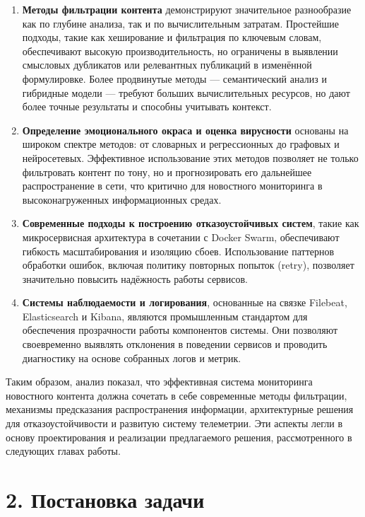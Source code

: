 \begin{enumerate}
\def\labelenumi{\arabic{enumi}.}
\tightlist
\item
  \textbf{Методы фильтрации контента} демонстрируют значительное
  разнообразие как по глубине анализа, так и по вычислительным затратам.
  Простейшие подходы, такие как хеширование и фильтрация по ключевым
  словам, обеспечивают высокую производительность, но ограничены в
  выявлении смысловых дубликатов или релевантных публикаций в изменённой
  формулировке. Более продвинутые методы --- семантический анализ и
  гибридные модели --- требуют больших вычислительных ресурсов, но дают
  более точные результаты и способны учитывать контекст.\\
\item
  \textbf{Определение эмоционального окраса и оценка вирусности}
  основаны на широком спектре методов: от словарных и регрессионных до
  графовых и нейросетевых. Эффективное использование этих методов
  позволяет не только фильтровать контент по тону, но и прогнозировать
  его дальнейшее распространение в сети, что критично для новостного
  мониторинга в высоконагруженных информационных средах.\\
\item
  \textbf{Современные подходы к построению отказоустойчивых систем},
  такие как микросервисная архитектура в сочетании с Docker Swarm,
  обеспечивают гибкость масштабирования и изоляцию сбоев. Использование
  паттернов обработки ошибок, включая политику повторных попыток
  (retry), позволяет значительно повысить надёжность работы сервисов.\\
\item
  \textbf{Системы наблюдаемости и логирования}, основанные на связке
  Filebeat, Elasticsearch и Kibana, являются промышленным стандартом для
  обеспечения прозрачности работы компонентов системы. Они позволяют
  своевременно выявлять отклонения в поведении сервисов и проводить
  диагностику на основе собранных логов и метрик.
\end{enumerate}

Таким образом, анализ показал, что эффективная система мониторинга
новостного контента должна сочетать в себе современные методы
фильтрации, механизмы предсказания распространения информации,
архитектурные решения для отказоустойчивости и развитую систему
телеметрии. Эти аспекты легли в основу проектирования и реализации
предлагаемого решения, рассмотренного в следующих главах работы.

\hypertarget{ux43fux43eux441ux442ux430ux43dux43eux432ux43aux430-ux437ux430ux434ux430ux447ux438}{%
\section{2. Постановка
задачи}\label{ux43fux43eux441ux442ux430ux43dux43eux432ux43aux430-ux437ux430ux434ux430ux447ux438}}

